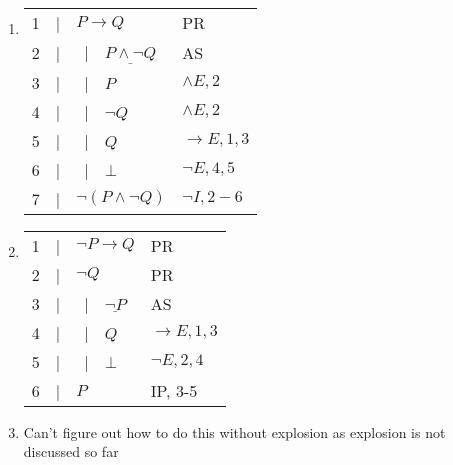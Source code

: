 \documentclass{article}
\newcommand{\asbar}{\ |\ \ }
\begin{document}
\begin{enumerate}
    \item

          \begin{tabular}{llp{5cm}l}
              1 & | & \underline{$P\to Q$}               & PR           \\
              2 & | & \asbar $\underline{P\land \neg Q}$ & AS           \\
              3 & | & \asbar $P$                         & $\land E,2$  \\
              4 & | & \asbar $\neg Q$                    & $\land E,2$  \\
              5 & | & \asbar $Q$                         & $\to E,1,3$  \\
              6 & | & \asbar $\bot$                      & $\neg E,4,5$ \\
              7 & | & $\neg(P\land \neg Q)$              & $\neg I,2-6$ \\
              \hline
          \end{tabular}

    \item

          \begin{tabular}{llp{5cm}l}
              1 & | & \underline{$\neg P\to Q$}   & PR           \\
              2 & | & \underline{$\neg Q$}        & PR           \\
              3 & | & \asbar $\underline{\neg P}$ & AS           \\
              4 & | & \asbar $Q$                  & $\to E,1,3$  \\
              5 & | & \asbar $\bot$               & $\neg E,2,4$ \\
              6 & | & $P$                         & IP, 3-5      \\
              \hline
          \end{tabular}

    \item Can't figure out how to do this without explosion as explosion is not discussed so far


\end{enumerate}
\end{document}
